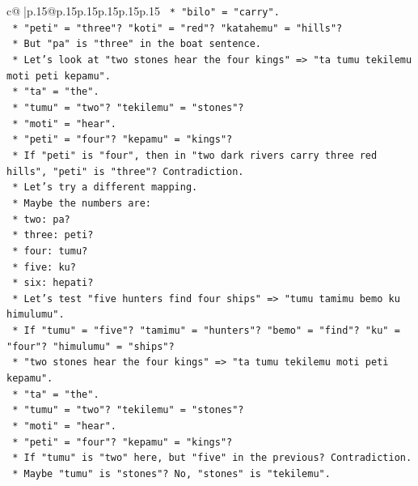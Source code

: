 \documentclass{article}
\begin{document}
{\begin{supertabular}{c@{$\;$}|p{.15\linewidth}@{}p{.15\linewidth}p{.15\linewidth}p{.15\linewidth}p{.15\linewidth}p{.15\linewidth}}
{{{\texttt{        *   "bilo" = "carry".} \\
\texttt{        *   "peti" = "three"? "koti" = "red"? "katahemu" = "hills"?} \\
\texttt{        *   But "pa" is "three" in the boat sentence.} \\
\texttt{        *   Let's look at "two stones hear the four kings" => "ta tumu tekilemu moti peti kepamu".} \\
\texttt{        *   "ta" = "the".} \\
\texttt{        *   "tumu" = "two"? "tekilemu" = "stones"?} \\
\texttt{        *   "moti" = "hear".} \\
\texttt{        *   "peti" = "four"? "kepamu" = "kings"?} \\
\texttt{        *   If "peti" is "four", then in "two dark rivers carry three red hills", "peti" is "three"? Contradiction.} \\
\texttt{        *   Let's try a different mapping.} \\
\texttt{        *   Maybe the numbers are:} \\
\texttt{            *   two: pa?} \\
\texttt{            *   three: peti?} \\
\texttt{            *   four: tumu?} \\
\texttt{            *   five: ku?} \\
\texttt{            *   six: hepati?} \\
\texttt{        *   Let's test "five hunters find four ships" => "tumu tamimu bemo ku himulumu".} \\
\texttt{            *   If "tumu" = "five"? "tamimu" = "hunters"? "bemo" = "find"? "ku" = "four"? "himulumu" = "ships"?} \\
\texttt{        *   "two stones hear the four kings" => "ta tumu tekilemu moti peti kepamu".} \\
\texttt{            *   "ta" = "the".} \\
\texttt{            *   "tumu" = "two"? "tekilemu" = "stones"?} \\
\texttt{            *   "moti" = "hear".} \\
\texttt{            *   "peti" = "four"? "kepamu" = "kings"?} \\
\texttt{        *   If "tumu" is "two" here, but "five" in the previous? Contradiction.} \\
\texttt{        *   Maybe "tumu" is "stones"? No, "stones" is "tekilemu".} \\
}}}
\end{supertabular}}
\end{document}
